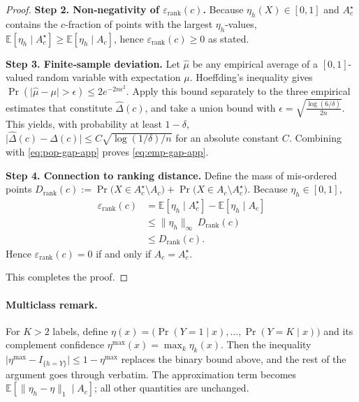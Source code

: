 \begin{proof}
\textbf{Step 2.  Non‑negativity of \(\varepsilon_{\mathrm{rank}}(c)\).}
Because \(\eta_h(X)\in[0,1]\) and
\(A_c^{\star}\) contains the \(c\)-fraction of points with the
largest \(\eta_h\)-values,
\(\mathbb E[\eta_h\mid A_c^{\star}]
 \ge\mathbb E[\eta_h\mid A_c]\),
hence \(\varepsilon_{\mathrm{rank}}(c)\ge0\) as stated.

\textbf{Step 3.  Finite‑sample deviation.}
Let \(\widehat{\mu}\) be any empirical average of a
\([0,1]\)-valued random variable with expectation \(\mu\).
Hoeffding’s inequality gives
\(\Pr(\lvert\widehat{\mu}-\mu\rvert>\epsilon)
   \le 2e^{-2n\epsilon^2}\).
Apply this bound separately to the three empirical estimates that
constitute \(\widehat{\Delta}(c)\), and take a union bound with
\(\epsilon=\sqrt{\tfrac{\log(6/\delta)}{2n}}\).
This yields, with probability at least \(1-\delta\),
\(
  \lvert\widehat{\Delta}(c)-\Delta(c)\rvert
  \le C\sqrt{\log(1/\delta)/n}
\)
for an absolute constant \(C\).
Combining with \eqref{eq:pop-gap-app} proves
\eqref{eq:emp-gap-app}.

\textbf{Step 4.  Connection to ranking distance.}
Define the mass of mis‑ordered points
\(D_{\mathrm{rank}}(c):=
 \Pr\bigl(X\in A_c^{\star}\setminus A_c\bigr)
 +\Pr\bigl(X\in A_c\setminus A_c^{\star}\bigr)\).
Because \(\eta_h\in[0,1]\),
\begin{align}
\varepsilon_{\mathrm{rank}}(c)
&=\mathbb E[\eta_h\mid A_c^{\star}]
  -\mathbb E[\eta_h\mid A_c]   \\[2pt]
&\le\bigl\|\eta_h\bigr\|_{\infty}\,
       D_{\mathrm{rank}}(c)        \\[2pt]
&\le D_{\mathrm{rank}}(c).
\end{align}
Hence \(\varepsilon_{\mathrm{rank}}(c)=0\)
if and only if \(A_c=A_c^{\star}\).

\smallskip\noindent
This completes the proof.
\end{proof}

\paragraph{Multiclass remark.}
For \(K>2\) labels, define
\(\eta(x)=\bigl(\Pr(Y=1\mid x),\dots,\Pr(Y=K\mid x)\bigr)\)
and its complement confidence
\(\eta^{\max}(x)=\max_{k}\eta_k(x)\).
Then the inequality
\(\lvert\eta^{\max}-I_{\{h=Y\}}\rvert
 \le 1-\eta^{\max}\)
replaces the binary bound above, and the rest of the argument
goes through verbatim.  The approximation term becomes
\(\mathbb E[\lVert\eta_h-\eta\rVert_1\mid A_c]\);
all other quantities are unchanged.


